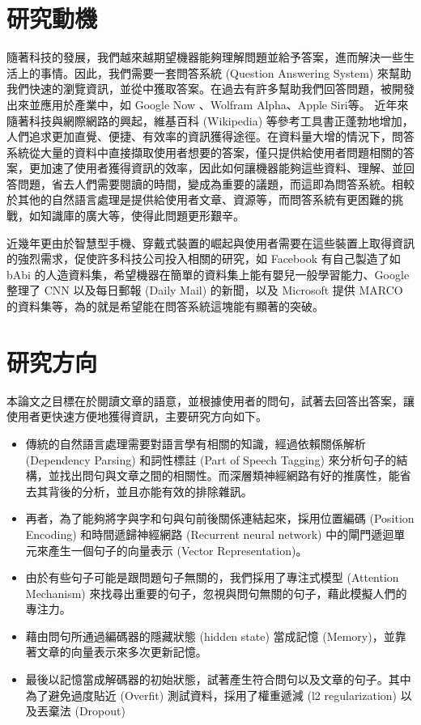 \section{研究動機}
隨著科技的發展，我們越來越期望機器能夠理解問題並給予答案，進而解決一些生活上的事情。因此，我們需要一套問答系統 (Question Answering System) 來幫助我們快速的瀏覽資訊，並從中獲取答案。在過去有許多幫助我們回答問題，被開發出來並應用於產業中，如 Google Now 、Wolfram Alpha、Apple Siri等。
近年來隨著科技與網際網路的興起，維基百科 (Wikipedia) 等參考工具書正蓬勃地增加，人們追求更加直覺、便捷、有效率的資訊獲得途徑。在資料量大增的情況下，問答系統從大量的資料中直接擷取使用者想要的答案，僅只提供給使用者問題相關的答案，更加速了使用者獲得資訊的效率，因此如何讓機器能夠這些資料、理解、並回答問題，省去人們需要閱讀的時間，變成為重要的議題，而這即為問答系統。相較於其他的自然語言處理是提供給使用者文章、資源等，而問答系統有更困難的挑戰，如知識庫的廣大等，使得此問題更形艱辛。

近幾年更由於智慧型手機、穿戴式裝置的崛起與使用者需要在這些裝置上取得資訊的強烈需求，促使許多科技公司投入相關的研究，如 Facebook 有自己製造了如 bAbi 的人造資料集，希望機器在簡單的資料集上能有嬰兒一般學習能力、Google 整理了 CNN 以及每日郵報 (Daily Mail) 的新聞，以及 Microsoft 提供 MARCO 的資料集等，為的就是希望能在問答系統這塊能有顯著的突破。



\section{研究方向}
本論文之目標在於閱讀文章的語意，並根據使用者的問句，試著去回答出答案，讓使用者更快速方便地獲得資訊，主要研究方向如下。
\begin{itemize}
    \item 傳統的自然語言處理需要對語言學有相關的知識，經過依賴關係解析 (Dependency Parsing) 和詞性標註 (Part of Speech Tagging) 來分析句子的結構，並找出問句與文章之間的相關性。而深層類神經網路有好的推廣性，能省去其背後的分析，並且亦能有效的排除雜訊。
    \item 再者，為了能夠將字與字和句與句前後關係連結起來，採用位置編碼 (Position Encoding) 和時間遞歸神經網路 (Recurrent neural network) 中的閘門遞迴單元來產生一個句子的向量表示 (Vector Representation)。
    \item 由於有些句子可能是跟問題句子無關的，我們採用了專注式模型 (Attention Mechanism) 來找尋出重要的句子，忽視與問句無關的句子，藉此模擬人們的專注力。
    \item 藉由問句所通過編碼器的隱藏狀態 (hidden state) 當成記憶 (Memory)，並靠著文章的向量表示來多次更新記憶。
    \item 最後以記憶當成解碼器的初始狀態，試著產生符合問句以及文章的句子。其中為了避免過度貼近 (Overfit) 測試資料，採用了權重遞減 (l2 regularization) 以及丟棄法 (Dropout)
\end{itemize}

